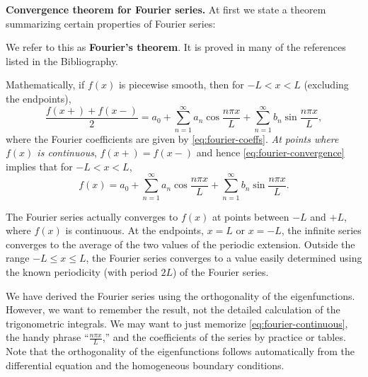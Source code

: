 \textbf{Convergence theorem for Fourier series.}  At first we state a theorem summarizing certain properties of Fourier series:

\begin{center}
\end{center}

We refer to this as \textbf{Fourier's theorem}.  It is proved in many of the references listed in the Bibliography.

Mathematically, if $f(x)$ is piecewise smooth, then for $-L < x < L$ (excluding the endpoints),
\begin{equation}
\label{eq:fourier-convergence}
\frac{f(x+) + f(x-)}{2} = a_0 + \sum_{n=1}^{\infty} a_n \cos \frac{n\pi x}{L} + \sum_{n=1}^{\infty} b_n \sin \frac{n\pi x}{L},
\end{equation}
where the Fourier coefficients are given by \eqref{eq:fourier-coeffs}.  \textit{At points where $f(x)$ is continuous}, $f(x+) = f(x-)$ and hence \eqref{eq:fourier-convergence} implies that for $-L < x < L$,
\begin{equation}
\label{eq:fourier-continuous}
f(x) = a_0 + \sum_{n=1}^{\infty} a_n \cos \frac{n\pi x}{L} + \sum_{n=1}^{\infty} b_n \sin \frac{n\pi x}{L}.
\end{equation}

The Fourier series actually converges to $f(x)$ at points between $-L$ and $+L$, where $f(x)$ is continuous.  At the endpoints, $x = L$ or $x = -L$, the infinite series converges to the average of the two values of the periodic extension.  Outside the range $-L \le x \le L$, the Fourier series converges to a value easily determined using the known periodicity (with period $2L$) of the Fourier series.

We have derived the Fourier series using the orthogonality of the eigenfunctions.  However, we want to remember the result, not the detailed calculation of the trigonometric integrals.  We may want to just memorize \eqref{eq:fourier-continuous}, the handy phrase ``$\frac{n\pi x}{L}$,'' and the coefficients of the series by practice or tables.  Note that the orthogonality of the eigenfunctions follows automatically from the differential equation and the homogeneous boundary conditions.

